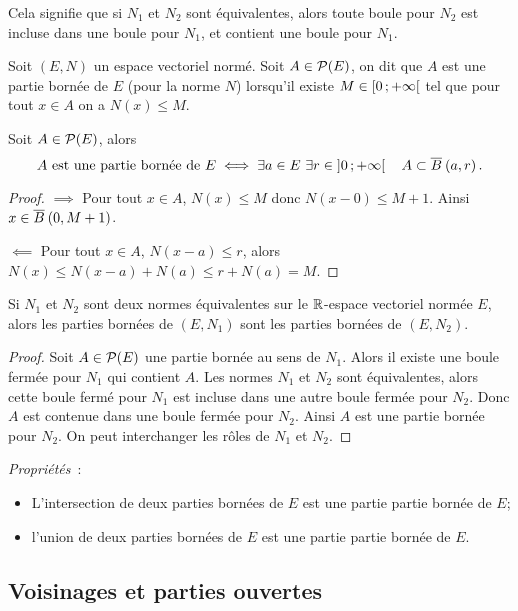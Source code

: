 Cela signifie que si $N_1$ et $N_2$ sont équivalentes, alors toute boule pour $N_2$ est incluse dans une boule pour $N_1$, et contient une boule pour $N_1$.

\begin{defdef}
  Soit $(E, N)$ un espace vectoriel normé. Soit $A \in \P(E)$, on dit que $A$ est une partie bornée de $E$ (pour la norme $N$) lorsqu'il existe $M \in \Rplus$ tel que pour tout $x \in A$ on a $N(x) \leqslant M$.
\end{defdef}
\begin{defdef}
  Soit $A \in \P(E)$, alors
  \begin{equation}
    A \text{~est une partie bornée de~} E \iff \exists a \in E \ \exists r \in \Rplusetoile \quad A \subset \Bbar{a}{r}{}.
  \end{equation}
\end{defdef}
\begin{proof}
  $\implies$ Pour tout $x \in A$, $N(x) \leqslant M$ donc $N(x-0) \leqslant M+1$. Ainsi $x \in \Bbar{0}{M+1}{}$.

  $\impliedby$ Pour tout $x \in A$, $N(x-a) \leqslant r$, alors $N(x) \leqslant N(x-a)+N(a) \leqslant r+N(a)=M$.
\end{proof}
\begin{prop}
  Si $N_1$ et $N_2$ sont deux normes équivalentes sur le $\R$-espace vectoriel normée $E$, alors les parties bornées de $(E, N_1)$ sont les parties bornées de $(E, N_2)$.
\end{prop}
\begin{proof}
  Soit $A \in \P(E)$ une partie bornée au sens de $N_1$. Alors il existe une boule fermée pour $N_1$ qui contient $A$. Les normes $N_1$ et $N_2$ sont équivalentes, alors cette boule fermé pour $N_1$ est incluse dans une autre boule fermée pour $N_2$. Donc $A$ est contenue dans une boule fermée pour $N_2$. Ainsi $A$ est une partie bornée pour $N_2$. On peut interchanger les rôles de $N_1$ et $N_2$.
\end{proof}

\emph{Propriétés}~:
\begin{itemize}
\item L'intersection de deux parties bornées de $E$ est une partie partie bornée de $E$;
\item l'union de deux parties bornées de $E$ est une partie partie bornée de $E$.
\end{itemize}

\subsection{Voisinages et parties ouvertes}

